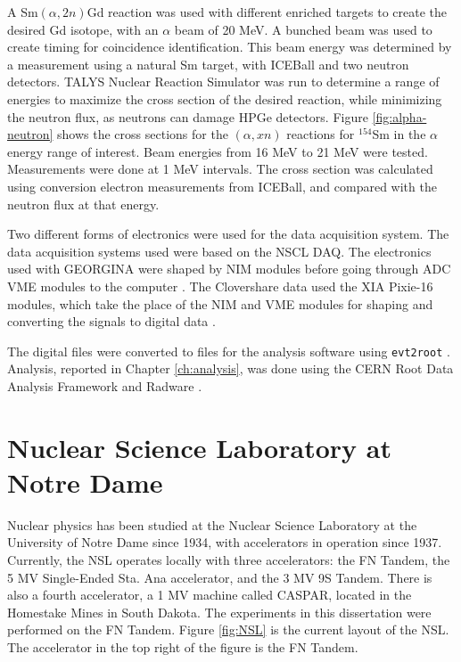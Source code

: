A Sm$(\alpha,2n)$Gd reaction was used with different enriched targets to create the desired Gd isotope, with an $\alpha$ beam of 20 MeV. A bunched beam was used to create timing for coincidence identification. This beam energy was determined by a measurement using a natural Sm target, with ICEBall and two neutron detectors. TALYS Nuclear Reaction Simulator was run to determine a range of energies to maximize the cross section of the desired reaction, while minimizing the neutron flux, as neutrons can damage HPGe detectors. Figure \ref{fig:alpha-neutron} shows the cross sections for the $(\alpha,xn)$ reactions for $^{154}$Sm in the $\alpha$ energy range of interest. Beam energies from 16 MeV to 21 MeV were tested. Measurements were done at 1 MeV intervals. The cross section was calculated using conversion electron measurements from ICEBall, and compared with the neutron flux at that energy.



Two different forms of electronics were used for the data acquisition system. The data acquisition systems used were based on the NSCL DAQ\citep{nscl:_daq,prokop14:_nsclddas}. The electronics used with GEORGINA were shaped by NIM modules before going through ADC VME modules to the computer \citep{mesytec:_ADC,caen:_TDC}. The Clovershare data used the XIA Pixie-16 modules, which take the place of the NIM and VME modules for shaping and converting the signals to digital data \citep{xia:_pixie}.

The digital files were converted to files for the analysis software using \texttt{evt2root} \citep{smith14:_evt2root}. Analysis, reported in Chapter \ref{ch:analysis}, was done using the CERN Root Data Analysis Framework and Radware \citep{brun97:_root,radford00:_radware}.

\section{Nuclear Science Laboratory at Notre Dame}

Nuclear physics has been studied at the Nuclear Science Laboratory at the University of Notre Dame since 1934, with accelerators in operation since 1937. Currently, the NSL operates locally with three accelerators: the FN Tandem, the 5 MV Single-Ended Sta. Ana accelerator, and the 3 MV 9S Tandem. There is also a fourth accelerator, a 1 MV machine called CASPAR, located in the Homestake Mines in South Dakota. The experiments in this dissertation were performed on the FN Tandem. Figure \ref{fig:NSL} is the current layout of the NSL. The accelerator in the top right of the figure is the FN Tandem.

